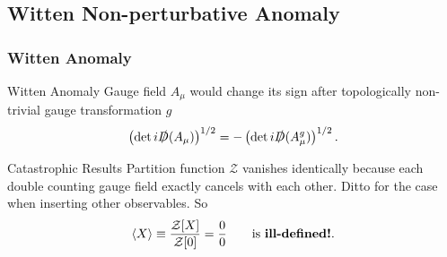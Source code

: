 \documentclass[10pt,aspectratio=43,xcolor=x11names,t]{beamer}%
\begin{document}
	\subsection{Witten Non-perturbative Anomaly}
		\begin{frame}
			\frametitle{Witten Anomaly}
			\begin{greenblock}{Witten Anomaly}
				Gauge field $A_\mu$ would change its sign after topologically non-trivial gauge transformation $g$
				\begin{equation*}
					\left(\mathrm{det}\,i\slashed{D}(A_\mu)\right)^{1/2}=-\left(\mathrm{det}\,i\slashed{D}(A^g_\mu)\right)^{1/2}.
				\end{equation*}
			\end{greenblock}
			\pause
			\begin{block}{Catastrophic Results}
				Partition function $\mathcal{Z}$ vanishes identically because each double counting gauge field exactly cancels with each other. Ditto for the case when inserting other observables. So
				\begin{equation*}
					\left\langle X\right\rangle\equiv\dfrac{\mathcal{Z}[X]}{\mathcal{Z}[0]}=\dfrac{0}{0}\qquad\text{is \textbf{ill-defined!}}.
				\end{equation*}
			\end{block}
		\end{frame}
\end{document}
